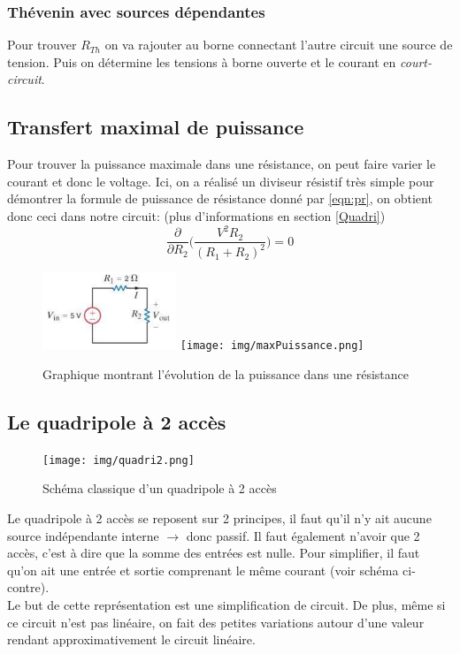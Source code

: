 \documentclass{report}
\begin{document}
\subsubsection{Thévenin avec sources dépendantes}
Pour trouver $R_{Th}$ on va rajouter au borne connectant l'autre circuit une source de tension. Puis on détermine les tensions à borne ouverte et le courant en \textit{court-circuit}.

\subsection{Transfert maximal de puissance}
Pour trouver la puissance maximale dans une résistance, on peut faire varier le courant et donc le voltage. Ici, on a réalisé un diviseur résistif très simple pour démontrer la formule de puissance de résistance donné par \ref{eqn:pr}, on obtient donc ceci dans notre circuit: (plus d'informations en section \ref{Quadri})
\begin{equation}
\frac{\partial}{\partial R_2} \biggl(\frac{V^2 R_2}{(R_1 + R_2)^2}\biggl) = 0
\end{equation}

\begin{figure}[H]
\centering
\includegraphics[width=4cm]{img/puisCircuit.png}
\texttt{[image: img/maxPuissance.png]}
\caption{Graphique montrant l'évolution de la puissance dans une résistance}
\end{figure}

\subsection{Le quadripole à 2 accès}
\begin{figure}
\centering
\texttt{[image: img/quadri2.png]}
\caption{Schéma classique d'un quadripole à 2 accès}
\end{figure}
Le quadripole à 2 accès se reposent sur 2 principes, il faut qu'il n'y ait aucune source indépendante interne $\rightarrow$ donc passif. Il faut également n'avoir que 2 accès, c'est à dire que la somme des entrées est nulle. Pour simplifier, il faut qu'on ait une entrée et sortie comprenant le même courant (voir schéma ci-contre).\\
Le but de cette représentation est une simplification de circuit. De plus, même si ce circuit n'est pas linéaire, on fait des petites variations autour d'une valeur rendant approximativement le circuit linéaire.\\
\end{document}
